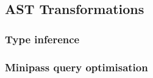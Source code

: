 \documentclass[main.tex]{subfiles}
\begin{document}
\subsection{AST Transformations}

\subsubsection{Type inference}
\label{sec:typeinf}

\subsubsection{Minipass query optimisation}
\end{document}
